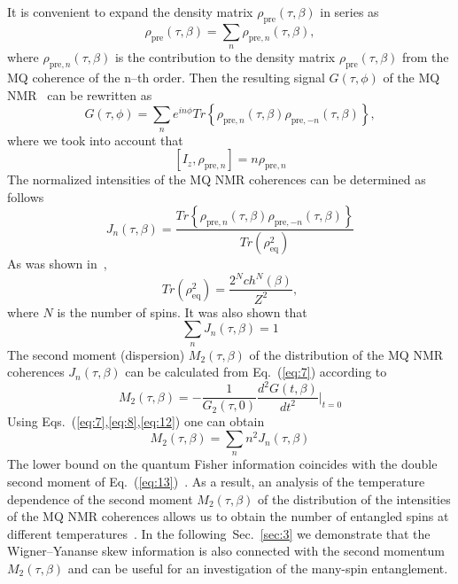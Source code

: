 \documentclass[preprint,12pt]{elsarticle}
\begin{document}
It is convenient to expand the density matrix $\rho_\mathrm{pre}(\tau, \beta)$ in series as~\cite{21}
\begin{equation}
    \label{eq:6}
        \rho_\mathrm{pre}(\tau,\beta) = \sum_n \rho_{\mathrm{pre},n}(\tau,\beta),
\end{equation}
where $\rho_{\mathrm{pre}, n}(\tau,\beta)$ is the contribution to the density matrix $\rho_\mathrm{pre}(\tau,\beta)$ from the MQ coherence of the n--th order.
Then the resulting signal $G(\tau,\phi)$ of the MQ NMR~\cite{10} can be rewritten as
\begin{equation} \label{eq:7}
    G(\tau, \phi) = \sum_n e^{in\phi}
        Tr\left\{\rho_{\mathrm{pre},n}(\tau,\beta)
        \rho_{\mathrm{pre},-n}(\tau,\beta) \right\},
\end{equation}
where we took into account that
\begin{equation}
    \label{eq:8}
        [I_z, \rho_{\mathrm{pre},n}] = n \rho_{\mathrm{pre},n}
\end{equation}
The normalized intensities of the MQ NMR coherences can be determined as follows
\begin{equation}
    \label{eq:9}
        J_n(\tau,\beta)= \frac{Tr\left\{\rho_{\mathrm{pre},n}(\tau,\beta)
            \rho_{\mathrm{pre},-n}(\tau,\beta)\right\}}
                {Tr(\rho^2_\mathrm{eq})}
\end{equation}
As was shown in~\cite{8},
\begin{equation}
    \label{eq:10}
        Tr(\rho_\mathrm{eq}^2) = \frac{2^N ch^N (\beta)}{Z^2},
\end{equation}
where $N$ is the number of spins.
It was also shown that
\begin{equation}
    \label{eq:11}
        \sum_n J_n(\tau,\beta) = 1
\end{equation}
The second moment (dispersion) $M_2(\tau,\beta)$ of the distribution of the MQ NMR coherences $J_n (\tau,\beta)$ can be calculated from Eq.~(\ref{eq:7}) according to~\cite{22}
\begin{equation}
    \label{eq:12}
        M_2(\tau,\beta) = -\frac{1}{G_2(\tau,0)}
            \frac{d^2 G(t,\beta)}{dt^2}\bigg|
        _{t=0}
\end{equation}
Using Eqs.~(\ref{eq:7},\ref{eq:8},\ref{eq:12}) one can obtain
\begin{equation}
    \label{eq:13}
        M_2 (\tau,\beta) = \sum_n n^2 J_n(\tau,\beta)
\end{equation}
The lower bound on the quantum Fisher information coincides with the double second moment of Eq.~(\ref{eq:13})~\cite{7,9}.
As a result, an analysis of the temperature dependence of the second moment $M_2(\tau,\beta)$ of the distribution of the intensities of the MQ NMR coherences allows us to obtain the number of entangled spins at different temperatures~\cite{8}.
In the following~Sec.~\ref{sec:3} we demonstrate that the Wigner--Yananse skew information is also connected with the second momentum $M_2(\tau,\beta)$
and can be useful for an investigation of the many-spin entanglement.
\end{document}
